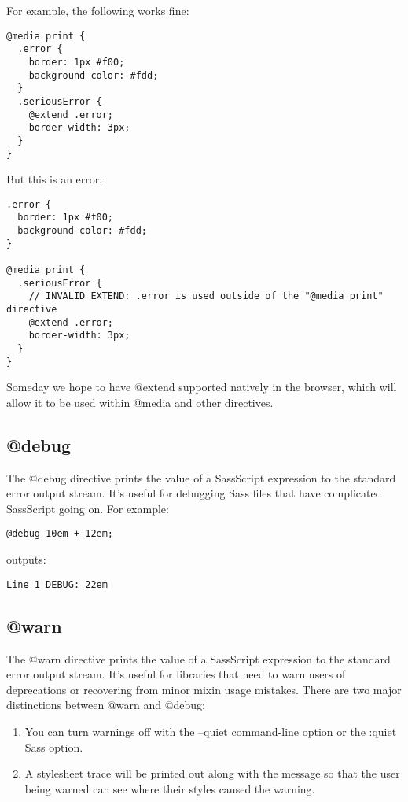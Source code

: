 \documentclass[9pt]{article}
\begin{document}
 For example, the following works fine:
\begin{verbatim}
@media print {
  .error {
    border: 1px #f00;
    background-color: #fdd;
  }
  .seriousError {
    @extend .error;
    border-width: 3px;
  }
}
\end{verbatim}


 But this is an error:
\begin{verbatim}
.error {
  border: 1px #f00;
  background-color: #fdd;
}

@media print {
  .seriousError {
    // INVALID EXTEND: .error is used outside of the "@media print" directive
    @extend .error;
    border-width: 3px;
  }
}
\end{verbatim}


 Someday we hope to have @extend supported natively in the browser, which will allow it to be used within @media and other directives.
\subsection{@debug}


 The @debug directive prints the value of a SassScript expression to the standard error output stream. It’s useful for debugging Sass files that have complicated SassScript going on. For example:
\begin{verbatim}
@debug 10em + 12em;
\end{verbatim}


 outputs:
\begin{verbatim}
Line 1 DEBUG: 22em
\end{verbatim}
\subsection{@warn}


 The @warn directive prints the value of a SassScript expression to the standard error output stream. It’s useful for libraries that need to warn users of deprecations or recovering from minor mixin usage mistakes. There are two major distinctions between @warn and @debug:
\begin{enumerate}
\item You can turn warnings off with the --quiet command-line option or the :quiet Sass option.
\item A stylesheet trace will be printed out along with the message so that the user being warned can see where their styles caused the warning.

\end{enumerate}
\end{document}
